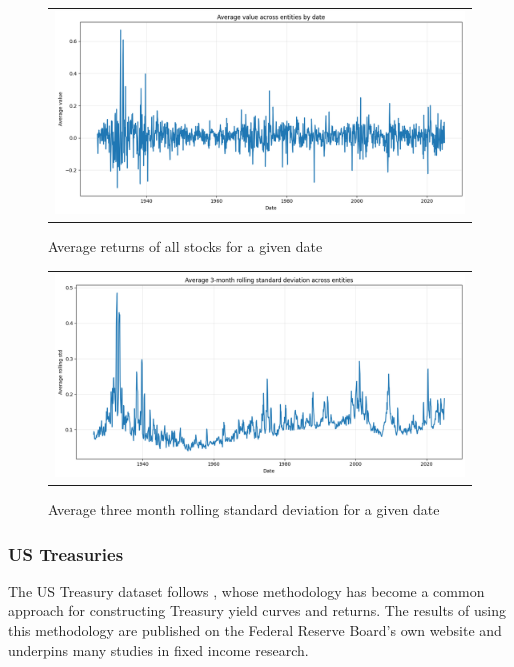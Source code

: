 \documentclass{article}
\begin{document}
\begin{appendices}
\begin{figure}[h]
  \centering
  \begin{tabular}{@{}c@{}}
    \includegraphics[width=.95\linewidth]{../docs_src/daily_avg_returns_CRSP_COMPU.png}
  \end{tabular}
  \caption{Average returns of all stocks for a given date}
  \label{fig:avg_returns_crsp}
\end{figure}

\begin{figure}[h]
  \centering
  \begin{tabular}{@{}c@{}}
    \includegraphics[width=.95\linewidth]{../docs_src/Average_three_month_rolling_std.png}
  \end{tabular}
  \caption{Average three month rolling standard deviation for a given date}
  \label{fig:avg_rolling_std_crsp}
\end{figure}


\subsubsection{US Treasuries}
\label{sec:treasuries}

The US Treasury dataset follows \cite{Gurkaynak2007}, whose methodology has become a common approach for constructing Treasury yield curves and returns. The results of using this methodology are published on the Federal Reserve Board's own website and underpins many studies in fixed income research.


\end{appendices}
\end{document}
